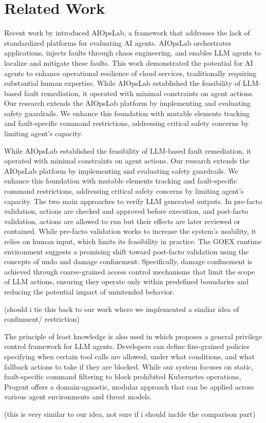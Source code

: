 \section{Related Work}
\label{sec:related_work}


Recent work by \cite{shetty2024aiagents} introduced AIOpsLab, a framework that addresses the lack of standardized platforms for evaluating AI agents. AIOpsLab orchestrates applications, injects faults through chaos engineering, and enables LLM agents to localize and mitigate these faults. This work demonstrated the potential for AI agents to enhance operational resilience of cloud services, traditionally requiring substantial human expertise. 
While AIOpsLab established the feasibility of LLM-based fault remediation, it operated with minimal constraints on agent actions. Our research extends the AIOpsLab platform by implementing and evaluating safety guardrails. We enhance this foundation with mutable elements tracking and fault-specific command restrictions, addressing critical safety concerns by limiting agent’s capacity. 

While AIOpsLab established the feasibility of LLM-based fault remediation, it operated with minimal constraints on agent actions. Our research extends the AIOpsLab platform by implementing and evaluating safety guardrails. We enhance this foundation with mutable elements tracking and fault-specific command restrictions, addressing critical safety concerns by limiting agent’s capacity. 
The two main approaches to verify LLM generated outputs. In pre-facto validation, actions are checked and approved before execution, and post-facto validation, actions are allowed to run but their effects are later reviewed or contained.
While pre-facto validation works to increase the system’s usability, it relies on human input, which limits its feasibility in practice. The GOEX runtime environment \cite{patil2024goexperspectivesdesignsruntime} suggests a promising shift toward post-facto validation using the concepts of undo and damage confinement. Specifically, damage confinement is achieved through coarse-grained access control mechanisms that limit the scope of LLM actions, ensuring they operate only within predefined boundaries and reducing the potential impact of unintended behavior.

(should i tie this back to our work where we implemented a simliar idea of confinment/ restriction)


The principle of least knowledge is also used in \cite{shi2025progent} which proposes a general privilege control framework for LLM agents. Developers can define fine-grained policies specifying when certain tool calls are allowed, under what conditions, and what fallback actions to take if they are blocked. While our system focuses on static, fault-specific command filtering to block prohibited Kubernetes operations, Progent offers a domain-agnostic, modular approach that can be applied across various agent environments and threat models.

(this is very similar to our idea, not sure if i should inclde the comparison part)

